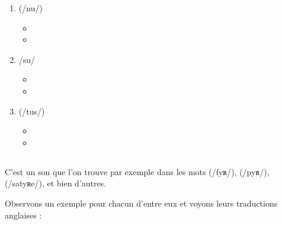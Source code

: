 \begin{enumerate}
\item {} (/nu/)
  \begin{itemize}
  \item {}
    \item {}
    \end{itemize}
    
\item {} /su/
  \begin{itemize}
  \item {}
  \item {}
  \end{itemize}

\item {} (/tus/)
  \begin{itemize}
  \item {}
  \item {}
  \end{itemize}
   
\end{enumerate}         
        
\subsection{}\label{subsec:yfr}

C'est un son que l'on trouve par exemple dans les mots
 (/fyʀ/),  (/pyʀ/),  (/satyʀe/), et bien d'autres.

Observons un exemple pour chacun d'entre eux et voyons leurs
traductions anglaises :\par

